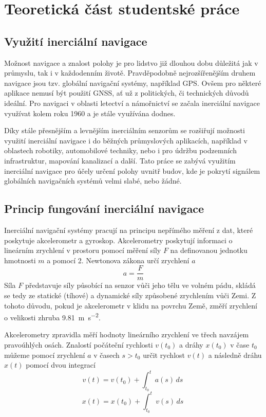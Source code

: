\chapter{Teoretická část studentské práce}
\section{Využití inerciální navigace}
Možnost navigace a znalost polohy je pro lidstvo již dlouhou dobu důležitá jak v průmyslu, tak i v každodenním životě. Pravděpodobně nejrozšířenějším druhem navigace jsou tzv. globální navigační systémy, například GPS. Ovšem pro některé aplikace nemusí být použití GNSS, ať už z politických, či technických důvodů ideální. Pro navigaci v oblasti letectví a námořnictví se začala inerciální navigace využívat kolem roku 1960 a je stále využívána dodnes. \cite{Tittertonc2004}

Díky stále přesnějším a levnějším inerciálním senzorům se rozšiřují možnosti využití inerciální navigace i do běžných průmyslových aplikacích, například v oblastech robotiky, automobilové techniky, nebo i pro údržbu podzemních infrastruktur, mapování kanalizací a další. \cite{Tittertonc2004} Tato práce se zabývá využitím inerciální navigace pro účely určení polohy uvnitř budov, kde je pokrytí signálem globálních navigačních systémů velmi slabé, nebo žádné.

\section{Princip fungování inerciální navigace}
Inerciální navigační systémy pracují na principu nepřímého měření z dat, které poskytuje akcelerometr a gyroskop.   
Akcelerometry poskytují informaci o lineárním zrychlení v prostoru pomocí měření síly $ F $ na definovanou jednotku hmotnosti $ m $ a pomocí 2. Newtonova zákona určí zrychlení $ a $ \cite{Tittertonc2004}
$$ a=\frac{F}{m} $$
Síla $ F $ představuje síly působící na senzor vůči jeho tělu ve volném pádu, skládá se tedy ze statické (tíhové) a dynamické síly způsobené zrychlením vůči Zemi. \cite{Tittertonc2004}
Z tohoto důvodu, pokud je akcelerometr v klidu na povrchu Země, změří zrychlení o velikosti zhruba \SI{9,81}{\meter\per\second\squared}.

Akcelerometry zpravidla měří hodnoty lineárního zrychlení ve třech navzájem pravoúhlých osách. Znalostí počáteční rychlosti $ v(t_{0}) $ a dráhy $ x(t_{0}) $ v čase $ t_{0} $ můžeme pomocí zrychlení $ a $ v časech $ s>t_{0} $ určit rychlost $ v(t) $ a následně dráhu $ x(t) $ pomocí dvou integrací \cite{Grewal2013}
$$ v(t)=v(t_{0}) + \int_{t_{0}}^{t} a(s) \,ds\ $$
$$ x(t)=x(t_{0}) + \int_{t_{0}}^{t} v(s) \,ds\ $$

